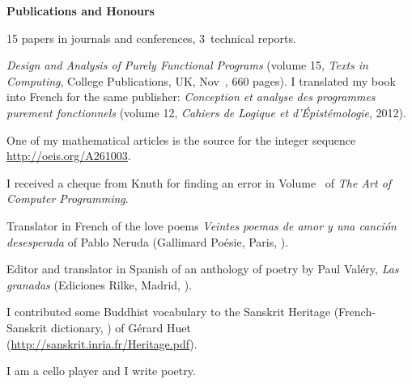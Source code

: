 \documentclass[a4paper,11pt]{article}
\begin{document}
\bigskip
\noindent\textbf{\large Publications and Honours}
\bigskip
\begin{itemize*}

  \item 15 papers in journals and conferences, 3~technical reports.

  \item \textit{Design and Analysis of Purely Functional Programs}
    (volume 15, \emph{Texts in Computing}, College Publications, UK,
    Nov~, 660 pages). I translated my book into
    French for the same publisher: \textit{Conception et analyse des
      programmes purement fonctionnels} (volume 12, \emph{Cahiers de
    Logique et d'Épistémologie}, 2012).

  \item One of my mathematical articles is the source for the integer
    sequence \url{http://oeis.org/A261003}.

  \item I received a cheque from Knuth for finding an error in
    Volume~ of \emph{The Art of Computer Programming}.

  \item Translator in French of the love poems \textit{Veintes poemas
    de amor y una canci\'on desesperada} of Pablo Neruda (Gallimard
    Po\'esie, Paris, ).

  \item Editor and translator in Spanish of an anthology of poetry by
    Paul Val\'ery, \emph{Las granadas} (Ediciones Rilke, Madrid,
    ).

  \item I contributed some Buddhist vocabulary to the Sanskrit
    Heritage (French-Sanskrit dictionary, ) of
    G\'{e}rard Huet\\ (\url{http://sanskrit.inria.fr/Heritage.pdf}).

  \item I am a cello player and I write poetry.

\end{itemize*}


%
\nocite{*}
\end{document}
